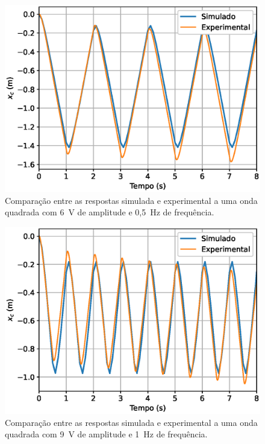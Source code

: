 \begin{figure}[H]
    \centering
    \includegraphics[width=0.8\linewidth]{figuras/validacao_6V.eps}
    \caption[Comparação entre as respostas simulada e experimental a uma onda quadrada com 6~V de amplitude e 0,5~Hz de frequência]{Comparação entre as respostas simulada e experimental a uma onda quadrada com 6~V de amplitude e 0,5~Hz de frequência.}
    \label{fig:validacao_6V}
\end{figure}

\begin{figure}[H]
    \centering
    \includegraphics[width=0.8\linewidth]{figuras/validacao_9V.eps}
    \caption[Comparação entre as respostas simulada e experimental a uma onda quadrada com 9~V de amplitude e 1~Hz de frequência]{Comparação entre as respostas simulada e experimental a uma onda quadrada com 9~V de amplitude e 1~Hz de frequência.}
    \label{fig:validacao_9V}
\end{figure}

